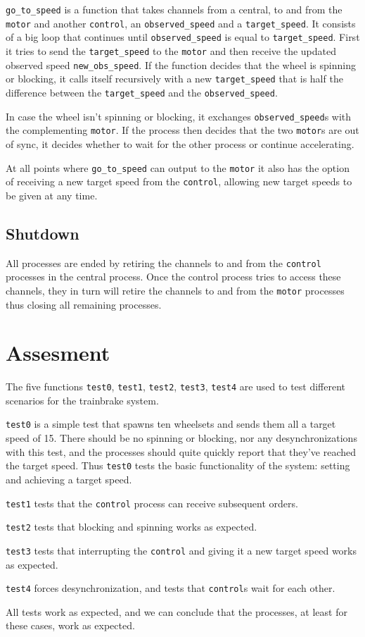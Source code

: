 \documentclass[a4paper, 10pt]{article}
\begin{document}
\verb+go_to_speed+ is a function that takes channels from a
central, to and from the \verb+motor+ and another
\verb+control+, an \verb+observed_speed+ and a \verb+target_speed+. It
consists of a big loop that continues until \verb+observed_speed+ is
equal to \verb+target_speed+. First it tries to send the
\verb+target_speed+ to the \verb+motor+ and then receive the updated
observed speed \verb+new_obs_speed+. If the function decides that the
wheel is spinning or blocking, it calls itself recursively with a new
\verb+target_speed+ that is half the difference between the
\verb+target_speed+ and the \verb+observed_speed+.

In case the wheel isn't spinning or blocking, it exchanges
\verb+observed_speed+s with the complementing \verb+motor+. If the
process then decides that the two \verb+motor+s are out of sync, it
decides whether to wait for the other process or continue accelerating.

At all points where \verb+go_to_speed+ can output to the \verb+motor+
it also has the option of receiving a new target speed from the
\verb+control+, allowing new target speeds to be given at any time.

\subsection{Shutdown}

All processes are ended by retiring the channels to and from the
\verb+control+ processes in the central process. Once the control
process tries to access these channels, they in turn will retire the
channels to and from the \verb+motor+ processes thus closing all
remaining processes.

\section{Assesment}

The five functions \verb+test0+, \verb+test1+, \verb+test2+,
\verb+test3+, \verb+test4+ are used to test different scenarios for
the trainbrake system. 

\verb+test0+ is a simple test that spawns ten wheelsets and sends them
all a target speed of 15. There should be no spinning or blocking, nor
any desynchronizations with this test, and the processes should quite
quickly report that they've reached the target speed. Thus
\verb+test0+ tests the basic functionality of the system: setting and
achieving a target speed.

\verb+test1+ tests that the \verb+control+ process can receive
subsequent orders.

\verb+test2+ tests that blocking and spinning works as expected.

\verb+test3+ tests that interrupting the \verb+control+ and giving it
a new target speed works as expected.

\verb+test4+ forces desynchronization, and tests that \verb+control+s
wait for each other.

All tests work as expected, and we can conclude that the processes, at
least for these cases, work as expected.
\end{document}

